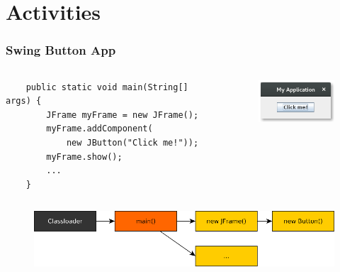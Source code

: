 \section{Activities}

\begin{frame}[c,fragile]
	\frametitle{Swing Button App}
	\begin{columns}
	\begin{lstlisting}
	public static void main(String[] args) {
	    JFrame myFrame = new JFrame();
	    myFrame.addComponent(
	        new JButton("Click me!"));
	    myFrame.show();
	    ...
	}
	\end{lstlisting}

	\pause
	\vspace{1cm}
	\begin{figure}
	\includegraphics[width=3cm]{pictures/button-swing.png}
	\end{figure}
	\end{columns}

	\pause \vspace{0.5cm}
	\begin{figure}
	\includegraphics[width=\textwidth]{pictures/call-hierachy-swing.png}
	\end{figure}
\end{frame}


